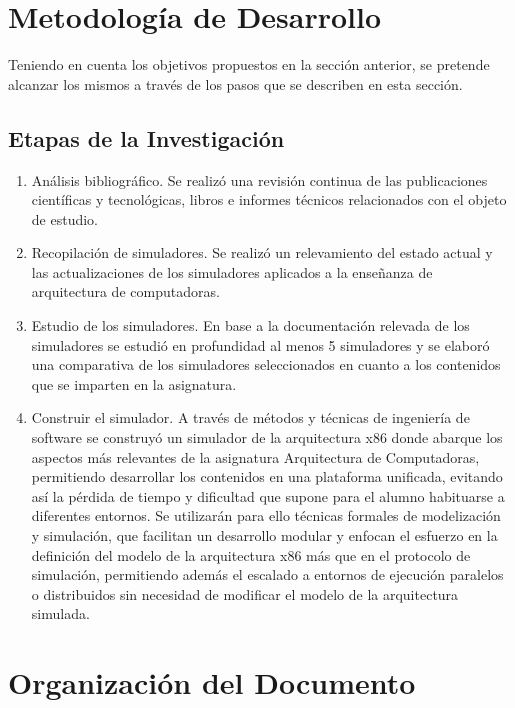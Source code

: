 \documentclass[12pt,twoside]{templates/unerthesis}
\providecommand{\tightlist}{%
  \setlength{\itemsep}{0pt}\setlength{\parskip}{0pt}}
\begin{document}
\hypertarget{metodologuxeda-de-desarrollo}{%
\section{Metodología de Desarrollo}\label{metodologuxeda-de-desarrollo}}

Teniendo en cuenta los objetivos propuestos en la sección anterior, se pretende alcanzar los mismos a través de los pasos que se describen en esta sección.

\hypertarget{etapas-de-la-investigaciuxf3n}{%
\subsection{Etapas de la Investigación}\label{etapas-de-la-investigaciuxf3n}}

\begin{enumerate}
\def\labelenumi{\alph{enumi}.}
\tightlist
\item
  Análisis bibliográfico.
  Se realizó una revisión continua de las publicaciones científicas y tecnológicas, libros e informes técnicos relacionados con el objeto de estudio.
\item
  Recopilación de simuladores.
  Se realizó un relevamiento del estado actual y las actualizaciones de los simuladores aplicados a la enseñanza de arquitectura de computadoras.
\item
  Estudio de los simuladores.
  En base a la documentación relevada de los simuladores se estudió en profundidad al menos 5 simuladores y se elaboró una comparativa de los simuladores seleccionados en cuanto a los contenidos que se imparten en la asignatura.
\item
  Construir el simulador.
  A través de métodos y técnicas de ingeniería de software se construyó un simulador de la arquitectura x86 donde abarque los aspectos más relevantes de la asignatura Arquitectura de Computadoras, permitiendo desarrollar los contenidos en una plataforma unificada, evitando así la pérdida de tiempo y dificultad que supone para el alumno habituarse a diferentes entornos. Se utilizarán para ello técnicas formales de modelización y simulación, que facilitan un desarrollo modular y enfocan el esfuerzo en la definición del modelo de la arquitectura x86 más que en el protocolo de simulación, permitiendo además el escalado a entornos de ejecución paralelos o distribuidos sin necesidad de modificar el modelo de la arquitectura simulada.
\end{enumerate}

\hypertarget{organizaciuxf3n-del-documento}{%
\section{Organización del Documento}\label{organizaciuxf3n-del-documento}}
\end{document}
